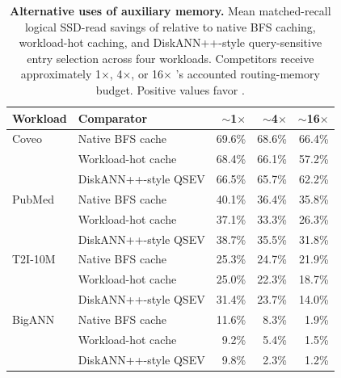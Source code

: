 \begin{table}[t]
\centering
\caption{\textbf{Alternative uses of auxiliary memory.} Mean matched-recall logical SSD-read savings of \sys relative to native BFS caching, workload-hot caching, and DiskANN++-style query-sensitive entry selection across four workloads. Competitors receive approximately 1$\times$, 4$\times$, or 16$\times$ \sys's accounted routing-memory budget. Positive values favor \sys.}
\label{tab:eval-final-core-competitors}
\small
\setlength{\tabcolsep}{2.8pt}
\begin{tabular}{@{}llrrr@{}}
\toprule
Workload & Comparator & $\sim$1$\times$ & $\sim$4$\times$ & $\sim$16$\times$ \\
\midrule
Coveo & Native BFS cache & 69.6\% & 68.6\% & 66.4\% \\
 & Workload-hot cache & 68.4\% & 66.1\% & 57.2\% \\
 & DiskANN++-style QSEV & 66.5\% & 65.7\% & 62.2\% \\
\midrule
PubMed & Native BFS cache & 40.1\% & 36.4\% & 35.8\% \\
 & Workload-hot cache & 37.1\% & 33.3\% & 26.3\% \\
 & DiskANN++-style QSEV & 38.7\% & 35.5\% & 31.8\% \\
\midrule
T2I-10M & Native BFS cache & 25.3\% & 24.7\% & 21.9\% \\
 & Workload-hot cache & 25.0\% & 22.3\% & 18.7\% \\
 & DiskANN++-style QSEV & 31.4\% & 23.7\% & 14.0\% \\
\midrule
BigANN & Native BFS cache & 11.6\% & 8.3\% & 1.9\% \\
 & Workload-hot cache & 9.2\% & 5.4\% & 1.5\% \\
 & DiskANN++-style QSEV & 9.8\% & 2.3\% & 1.2\% \\
\bottomrule
\end{tabular}
\end{table}
